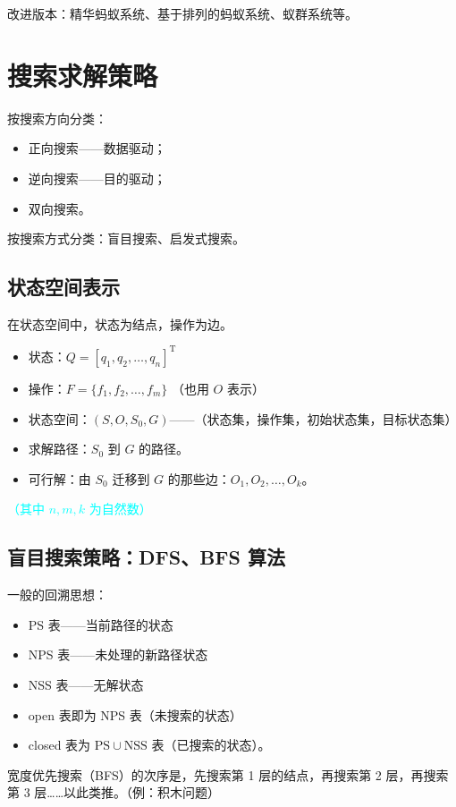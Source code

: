 \documentclass[UTF8]{ctexart}
\begin{document}
改进版本：精华蚂蚁系统、基于排列的蚂蚁系统、蚁群系统等。

\section{搜索求解策略}
按搜索方向分类：
\begin{itemize}[itemsep=0pt,parsep=0pt]
  \item 正向搜索——数据驱动；
  \item 逆向搜索——目的驱动；
  \item 双向搜索。
\end{itemize}

按搜索方式分类：盲目搜索、启发式搜索。

\subsection{状态空间表示}

在状态空间中，状态为结点，操作为边。
\begin{itemize}[itemsep=0pt,parsep=0pt]
  \item 状态：$Q = [q_1, q_2, \dots, q_n]^{\mathrm{T}}$
  \item 操作：$F = \{f_1, f_2, \dots, f_m\}$ （也用 $O$ 表示）
  \item 状态空间：$(S,O,S_0,G)$——（状态集，操作集，初始状态集，目标状态集）
  \item 求解路径：$S_0$ 到 $G$ 的路径。
  \item 可行解：由 $S_0$ 迁移到 $G$ 的那些边：$O_1,O_2,\dots,O_k$。
\end{itemize}
\textcolor{cyan}{（其中 $n,m,k$ 为自然数）}

\subsection{盲目搜索策略：DFS、BFS 算法}
一般的回溯思想：
\begin{itemize}[itemsep=0pt,parsep=0pt]
  \item PS 表——当前路径的状态
  \item NPS 表——未处理的新路径状态
  \item NSS 表——无解状态
  \item open 表即为 NPS 表（未搜索的状态）
  \item closed 表为 $\mathrm{PS \cup NSS}$ 表（已搜索的状态）。
\end{itemize}

宽度优先搜索（BFS）的次序是，先搜索第 1 层的结点，再搜索第 2 层，再搜索第 3 层……以此类推。（例：积木问题）
\end{document}
